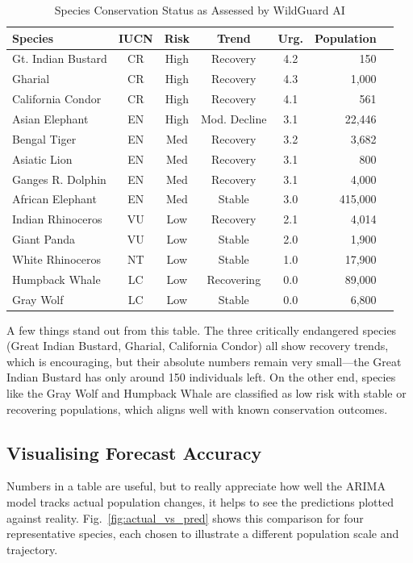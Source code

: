 \documentclass[conference]{IEEEtran}
\begin{document}
\begin{table}[h]
\caption{Species Conservation Status as Assessed by WildGuard AI}
\label{tab:species_status}
\centering
\setlength{\tabcolsep}{3pt}
\scriptsize
\begin{tabular}{@{}lccccrr@{}}
\toprule
\textbf{Species} & \textbf{IUCN} & \textbf{Risk} & \textbf{Trend} & \textbf{Urg.} & \textbf{Population} \\
\midrule
Gt. Indian Bustard & CR & High & Recovery & 4.2 & 150 \\
Gharial & CR & High & Recovery & 4.3 & 1,000 \\
California Condor & CR & High & Recovery & 4.1 & 561 \\
Asian Elephant & EN & High & Mod. Decline & 3.1 & 22,446 \\
Bengal Tiger & EN & Med & Recovery & 3.2 & 3,682 \\
Asiatic Lion & EN & Med & Recovery & 3.1 & 800 \\
Ganges R. Dolphin & EN & Med & Recovery & 3.1 & 4,000 \\
African Elephant & EN & Med & Stable & 3.0 & 415,000 \\
Indian Rhinoceros & VU & Low & Recovery & 2.1 & 4,014 \\
Giant Panda & VU & Low & Stable & 2.0 & 1,900 \\
White Rhinoceros & NT & Low & Stable & 1.0 & 17,900 \\
Humpback Whale & LC & Low & Recovering & 0.0 & 89,000 \\
Gray Wolf & LC & Low & Stable & 0.0 & 6,800 \\
\bottomrule
\end{tabular}
\end{table}

A few things stand out from this table. The three critically endangered species (Great Indian Bustard, Gharial, California Condor) all show recovery trends, which is encouraging, but their absolute numbers remain very small---the Great Indian Bustard has only around 150 individuals left. On the other end, species like the Gray Wolf and Humpback Whale are classified as low risk with stable or recovering populations, which aligns well with known conservation outcomes.

\subsection{Visualising Forecast Accuracy}

Numbers in a table are useful, but to really appreciate how well the ARIMA model tracks actual population changes, it helps to see the predictions plotted against reality. Fig.~\ref{fig:actual_vs_pred} shows this comparison for four representative species, each chosen to illustrate a different population scale and trajectory.
\end{document}
